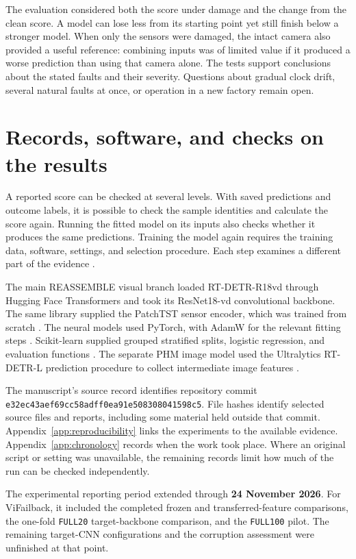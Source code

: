 The evaluation considered both the score under damage and the change from the clean score. A model can lose less from its starting point yet still finish below a stronger model. When only the sensors were damaged, the intact camera also provided a useful reference: combining inputs was of limited value if it produced a worse prediction than using that camera alone. The tests support conclusions about the stated faults and their severity. Questions about gradual clock drift, several natural faults at once, or operation in a new factory remain open.

\section{Records, software, and checks on the results}
\label{sec:ch4-reproducibility}

A reported score can be checked at several levels. With saved predictions and outcome labels, it is possible to check the sample identities and calculate the score again. Running the fitted model on its inputs also checks whether it produces the same predictions. Training the model again requires the training data, software, settings, and selection procedure. Each step examines a different part of the evidence \parencite{P009}.

The main REASSEMBLE visual branch loaded RT-DETR-R18vd through Hugging Face Transformers and took its ResNet18-vd convolutional backbone. The same library supplied the PatchTST sensor encoder, which was trained from scratch \parencite{Wolf2020Transformers}. The neural models used PyTorch, with AdamW for the relevant fitting steps \parencite{Paszke2019PyTorch}. Scikit-learn supplied grouped stratified splits, logistic regression, and evaluation functions \parencite{Pedregosa2011ScikitLearn}. The separate PHM image model used the Ultralytics RT-DETR-L prediction procedure to collect intermediate image features \parencite{UltralyticsRTDETR}.

The manuscript’s source record identifies repository commit \texttt{e32ec43aef69cc58adff0ea91e508308041598c5}. File hashes identify selected source files and reports, including some material held outside that commit. Appendix~\ref{app:reproducibility} links the experiments to the available evidence. Appendix~\ref{app:chronology} records when the work took place. Where an original script or setting was unavailable, the remaining records limit how much of the run can be checked independently.

The experimental reporting period extended through \textbf{24 November 2026}. For ViFailback, it included the completed frozen and transferred-feature comparisons, the one-fold \texttt{FULL20} target-backbone comparison, and the \texttt{FULL100} pilot. The remaining target-CNN configurations and the corruption assessment were unfinished at that point.

